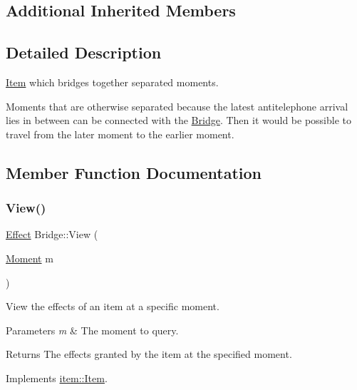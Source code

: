 \subsection*{Additional Inherited Members}


\subsection{Detailed Description}
\hyperlink{classitem_1_1_item}{Item} which bridges together separated moments. 

Moments that are otherwise separated because the latest antitelephone arrival lies in between can be connected with the \hyperlink{classitem_1_1_bridge}{Bridge}. Then it would be possible to travel from the later moment to the earlier moment. 

\subsection{Member Function Documentation}
\mbox{\label{classitem_1_1_bridge_a7d579da1f368ba6a6b5dfd41de833f17}} 
\subsubsection{\texorpdfstring{View()}{View()}}
{\footnotesize\ttfamily \hyperlink{classitem_1_1_effect}{Effect} Bridge\+::\+View (\begin{DoxyParamCaption}\item[{\hyperlink{classtimeplane_1_1_moment}{Moment}}]{m }\end{DoxyParamCaption})\hspace{0.3cm}{\ttfamily [virtual]}}



View the effects of an item at a specific moment. 


\begin{DoxyParams}{Parameters}
{\em m} & The moment to query. \\
\hline
\end{DoxyParams}
\begin{DoxyReturn}{Returns}
The effects granted by the item at the specified moment. 
\end{DoxyReturn}


Implements \hyperlink{classitem_1_1_item_a400dfeabc4056d36bfd348ff9c51cf7d}{item\+::\+Item}.


